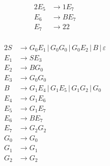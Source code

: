 {\begin{center}
\begin{minipage}[c]{0.3\textwidth}
\begin{alignat*}{2}
	E_5 &\rightarrow 1E_7 \\
	E_6 &\rightarrow BE_7\\
	E_7 &\rightarrow 22\\
\end{alignat*} \end{minipage}%
\begin{minipage}[c]{0.4\textwidth} \begin{alignat*}{2}
	S &\rightarrow G_0E_1\,|\,G_0G_0\,|\,G_0E_2\,|\,B\,|\,\varepsilon\\
	E_1 &\rightarrow SE_3\\
	E_2 &\rightarrow BG_0\\
	E_3 &\rightarrow G_0G_0\\
	B &\rightarrow G_1E_4\,|\,G_1E_5\,|\,G_1G_2\,|\,G_0\\
	E_4 &\rightarrow G_1E_6\\
	E_5 &\rightarrow G_1E_7 \\
	E_6 &\rightarrow BE_7\\
	E_7 &\rightarrow G_2G_2\\
	G_0 &\rightarrow G_0\\
	G_1 &\rightarrow G_1\\
	G_2 &\rightarrow G_2
\end{alignat*} \end{minipage}
\end{center}
}
